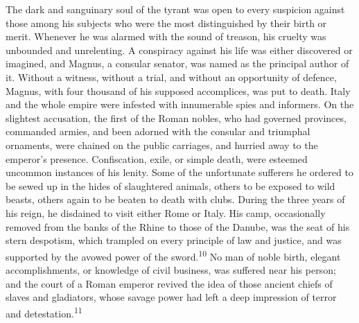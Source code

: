 The dark and sanguinary soul of the tyrant was open to every
suspicion against those among his subjects who were the most
distinguished by their birth or merit. Whenever he was alarmed
with the sound of treason, his cruelty was unbounded and
unrelenting. A conspiracy against his life was either discovered
or imagined, and Magnus, a consular senator, was named as the
principal author of it. Without a witness, without a trial, and
without an opportunity of defence, Magnus, with four thousand of
his supposed accomplices, was put to death. Italy and the whole
empire were infested with innumerable spies and informers. On the
slightest accusation, the first of the Roman nobles, who had
governed provinces, commanded armies, and been adorned with the
consular and triumphal ornaments, were chained on the public
carriages, and hurried away to the emperor’s presence.
Confiscation, exile, or simple death, were esteemed uncommon
instances of his lenity. Some of the unfortunate sufferers he
ordered to be sewed up in the hides of slaughtered animals,
others to be exposed to wild beasts, others again to be beaten to
death with clubs. During the three years of his reign, he
disdained to visit either Rome or Italy. His camp, occasionally
removed from the banks of the Rhine to those of the Danube, was
the seat of his stern despotism, which trampled on every
principle of law and justice, and was supported by the avowed
power of the sword.\textsuperscript{10} No man of noble birth, elegant
accomplishments, or knowledge of civil business, was suffered
near his person; and the court of a Roman emperor revived the
idea of those ancient chiefs of slaves and gladiators, whose
savage power had left a deep impression of terror and
detestation.\textsuperscript{11}



